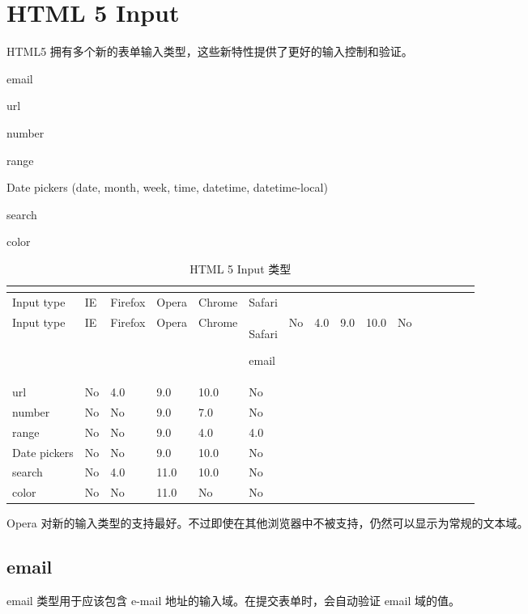 \section{HTML 5 Input}

HTML5 拥有多个新的表单输入类型，这些新特性提供了更好的输入控制和验证。


\begin{compactitem}
\item email
\item url
\item number
\item range
\item Date pickers (date, month, week, time, datetime, datetime-local)
\item search
\item color
\end{compactitem}

\begin{longtable}{|p{80pt}|p{50pt}|p{50pt}|p{50pt}|p{50pt}|p{50pt}|}
\tabularnewline\hline
Input type	&IE	&Firefox	&Opera	&Chrome	&Safari
\endhead

\caption{HTML 5 Input 类型}\\
\hline
Input type	&IE	&Firefox	&Opera	&Chrome	&Safari
\endfirsthead

\endfoot

\endlastfoot
\hline
email	&No		&4.0	&9.0	&10.0	&No\\
\hline
url		&No		&4.0	&9.0	&10.0	&No\\
\hline
number	&No		&No		&9.0	&7.0	&No\\
\hline
range	&No		&No		&9.0	&4.0	&4.0\\
\hline
Date pickers&	No	&No		&9.0	&10.0	&No\\
\hline
search	&No		&4.0	&11.0	&10.0	&No\\
\hline
color	&No		&No		&11.0	&No		&No\\
\hline
\end{longtable}



Opera 对新的输入类型的支持最好。不过即使在其他浏览器中不被支持，仍然可以显示为常规的文本域。

\subsection{email}

email 类型用于应该包含 e-mail 地址的输入域。在提交表单时，会自动验证 email 域的值。

